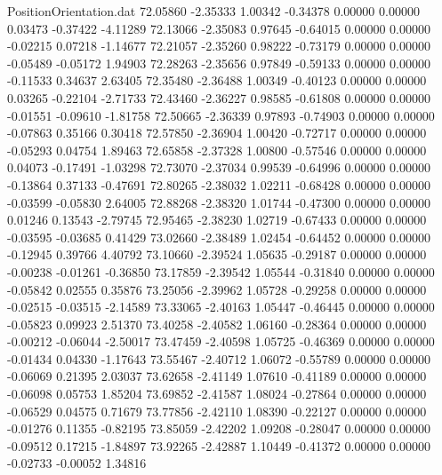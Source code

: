 \begin{filecontents}{PositionOrientation.dat}
  72.05860   -2.35333    1.00342    -0.34378    0.00000    0.00000    0.03473   -0.37422   -4.11289
  72.13066   -2.35083    0.97645    -0.64015    0.00000    0.00000   -0.02215    0.07218   -1.14677
  72.21057   -2.35260    0.98222    -0.73179    0.00000    0.00000   -0.05489   -0.05172    1.94903
  72.28263   -2.35656    0.97849    -0.59133    0.00000    0.00000   -0.11533    0.34637    2.63405
  72.35480   -2.36488    1.00349    -0.40123    0.00000    0.00000    0.03265   -0.22104   -2.71733
  72.43460   -2.36227    0.98585    -0.61808    0.00000    0.00000   -0.01551   -0.09610   -1.81758
  72.50665   -2.36339    0.97893    -0.74903    0.00000    0.00000   -0.07863    0.35166    0.30418
  72.57850   -2.36904    1.00420    -0.72717    0.00000    0.00000   -0.05293    0.04754    1.89463
  72.65858   -2.37328    1.00800    -0.57546    0.00000    0.00000    0.04073   -0.17491   -1.03298
  72.73070   -2.37034    0.99539    -0.64996    0.00000    0.00000   -0.13864    0.37133   -0.47691
  72.80265   -2.38032    1.02211    -0.68428    0.00000    0.00000   -0.03599   -0.05830    2.64005
  72.88268   -2.38320    1.01744    -0.47300    0.00000    0.00000    0.01246    0.13543   -2.79745
  72.95465   -2.38230    1.02719    -0.67433    0.00000    0.00000   -0.03595   -0.03685    0.41429
  73.02660   -2.38489    1.02454    -0.64452    0.00000    0.00000   -0.12945    0.39766    4.40792
  73.10660   -2.39524    1.05635    -0.29187    0.00000    0.00000   -0.00238   -0.01261   -0.36850
  73.17859   -2.39542    1.05544    -0.31840    0.00000    0.00000   -0.05842    0.02555    0.35876
  73.25056   -2.39962    1.05728    -0.29258    0.00000    0.00000   -0.02515   -0.03515   -2.14589
  73.33065   -2.40163    1.05447    -0.46445    0.00000    0.00000   -0.05823    0.09923    2.51370
  73.40258   -2.40582    1.06160    -0.28364    0.00000    0.00000   -0.00212   -0.06044   -2.50017
  73.47459   -2.40598    1.05725    -0.46369    0.00000    0.00000   -0.01434    0.04330   -1.17643
  73.55467   -2.40712    1.06072    -0.55789    0.00000    0.00000   -0.06069    0.21395    2.03037
  73.62658   -2.41149    1.07610    -0.41189    0.00000    0.00000   -0.06098    0.05753    1.85204
  73.69852   -2.41587    1.08024    -0.27864    0.00000    0.00000   -0.06529    0.04575    0.71679
  73.77856   -2.42110    1.08390    -0.22127    0.00000    0.00000   -0.01276    0.11355   -0.82195
  73.85059   -2.42202    1.09208    -0.28047    0.00000    0.00000   -0.09512    0.17215   -1.84897
  73.92265   -2.42887    1.10449    -0.41372    0.00000    0.00000   -0.02733   -0.00052    1.34816

\end{filecontents}
